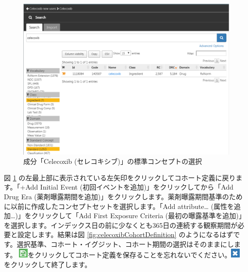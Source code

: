 \documentclass[
  11pt]{book}
\theoremstyle{definition}
\theoremstyle{definition}
\theoremstyle{definition}
\theoremstyle{definition}
\theoremstyle{remark}
\begin{document}
\begin{figure}

{\centering \includegraphics[width=1\linewidth]{images/SuggestedAnswers/conceptSearchAtlas} 

}

\caption{成分「Celecoxib (セレコキシブ)」の標準コンセプトの選択}\label{fig:conceptSearchAtlas}
\end{figure}

図 \ref{fig:conceptSearchAtlas} の左最上部に表示されている左矢印をクリックしてコホート定義に戻ります。「+Add Initial Event (初回イベントを追加)」をクリックしてから「Add Drug Era (薬剤曝露期間を追加)」をクリックします。薬剤曝露期間基準のために以前に作成したコンセプトセットを選択します。「Add attribute\ldots{} (属性を追加\ldots)」をクリックして「Add First Exposure Criteria (最初の曝露基準を追加)」を選択します。インデックス日の前に少なくとも365日の連続する観察期間が必要と設定します。結果は図 \ref{fig:celecoxibCohortDefinition} のようになるはずです。選択基準、コホート・イグジット、コホート期間の選択はそのままにします。 \includegraphics{images/Cohorts/save.png}をクリックしてコホート定義を保存ることを忘れないでください。\includegraphics{images/SuggestedAnswers/close.png} をクリックして終了します。
\end{document}
